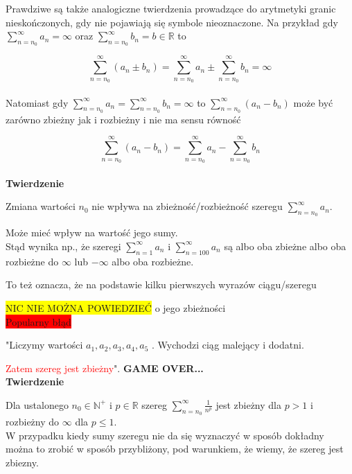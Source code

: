\documentclass[12pt]{article}
\begin{document}
Prawdziwe są także analogiczne twierdzenia prowadzące do arytmetyki granic nieskończonych, gdy nie pojawiają się symbole nieoznaczone.
Na przykład gdy $ \sum\limits_{n = n_0}^{\infty} a_n = \infty $ oraz $ \sum\limits_{n = n_0}^{\infty} b_n = b \in \mathbb{R} $ to 

$$ \sum\limits_{n = n_0}^{\infty} (a_n \pm b_n) = \sum\limits_{n = n_0}^{\infty} a_n \pm \sum\limits_{n = n_0}^{\infty} b_n = \infty $$ \\

Natomiast gdy $ \sum\limits_{n = n_0}^{\infty} a_n = \sum\limits_{n = n_0}^{\infty} b_n = \infty $ to
$ \sum\limits_{n = n_0}^{\infty} (a_n - b_n) $ może być zarówno zbieżny jak i rozbieżny i nie ma sensu równość

$$ \sum\limits_{n = n_0}^{\infty} (a_n - b_n) = \sum\limits_{n = n_0}^{\infty} a_n - \sum\limits_{n = n_0}^{\infty} b_n $$ \\

\textbf{Twierdzenie}

Zmiana wartości $n_0$ nie wpływa na zbieżność/rozbieżność szeregu $ \sum\limits_{n = n_0}^{\infty} a_n $.

Może mieć wpływ na wartość jego sumy. \\

Stąd wynika np., że szeregi $ \sum\limits_{n = 1}^{\infty} a_n $ i $ \sum\limits_{n = 100}^{\infty} a_n $ są albo oba zbieżne
albo oba rozbieżne do $ \infty $ lub $-\infty$ albo oba rozbieżne.

To też oznacza, że na podstawie kilku pierwszych wyrazów ciągu/szeregu

\colorbox{yellow}{NIC NIE MOŻNA POWIEDZIEĆ} o jego zbieżności \\

\colorbox{red}{Popularny błąd}

"Liczymy wartości $ a_1, a_2, a_3, a_4, a_5$ . Wychodzi ciąg malejący i dodatni.

\textcolor{red}{Zatem szereg jest zbieżny}". \textbf{GAME OVER...} \\

\textbf{Twierdzenie}

Dla ustalonego $ n_0 \in \mathbb{N}^+ $ i $ p \in \mathbb{R} $ szereg $ \sum\limits_{n = n_0}^{\infty} \frac{1}{n^p} $
jest zbieżny dla $ p > 1 $ i rozbieżny do $\infty$ dla $p \leq 1$.  \\

W przypadku kiedy sumy szeregu nie da się wyznaczyć w sposób dokładny można to zrobić w sposób przybliżony, pod warunkiem, że wiemy,
że szereg jest zbiezny. \\
\end{document}
